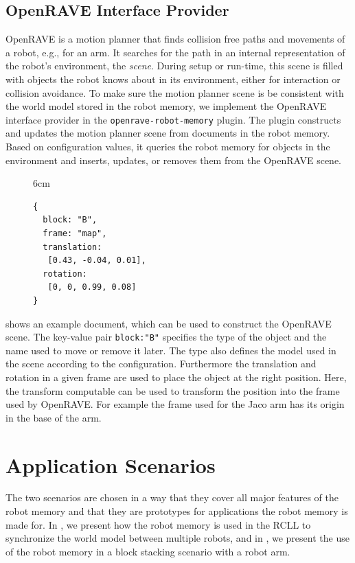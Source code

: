 \subsection{OpenRAVE Interface Provider}
\label{sec:impl-openrave}
OpenRAVE is a motion planner that finds collision free paths and
movements of a robot, e.g., for an arm. It searches for the path in an
internal representation of the robot's environment, the
\emph{scene}. During setup or run-time, this scene is filled with
objects the robot knows about in its environment, either for
interaction or collision avoidance. To make sure the motion
planner scene is be consistent with the world model stored in the
robot memory, we implement the OpenRAVE interface provider in the
\texttt{openrave-robot-memory} plugin. The plugin constructs and
updates the motion planner scene from documents in the robot
memory. Based on configuration values, it queries the robot memory for
objects in the environment and inserts, updates, or removes them from
the OpenRAVE scene.
\begin{figure}{6cm}
  \vspace{-0.8cm}
\begin{lstlisting}[style=SmallJSON,
  caption={Document used to construct the OpenRAVE scene},
  label=lst:openrave,
  framexleftmargin=5pt, xleftmargin=0pt,
 morekeywords={}, numbers=none]
{
  block: "B",
  frame: "map",
  translation:
   [0.43, -0.04, 0.01],
  rotation:
   [0, 0, 0.99, 0.08]
}
\end{lstlisting}
\vspace{-8mm}
\end{figure}
 shows an example document, which can be used to
construct the OpenRAVE scene. The key-value pair \texttt{block:"B"}
specifies the type of the object and the name used to move or remove
it later. The type also defines the model used in the scene according
to the configuration. Furthermore the translation and rotation in a
given frame are used to place the object at the right position. Here,
the transform computable can be used to transform the position into
the frame used by OpenRAVE. For example the frame used for the Jaco
arm has its origin in the base of the arm.

\section{Application Scenarios}
\label{sec:applicationscenarios}
The two scenarios are chosen in a way that they
cover all major features of the robot memory and that they are
prototypes for applications the robot memory is made for.
In , we present how the robot memory is used in
the RCLL to synchronize the world model between multiple robots, and in
, we present the use of the robot memory
in a block stacking scenario with a robot arm.

